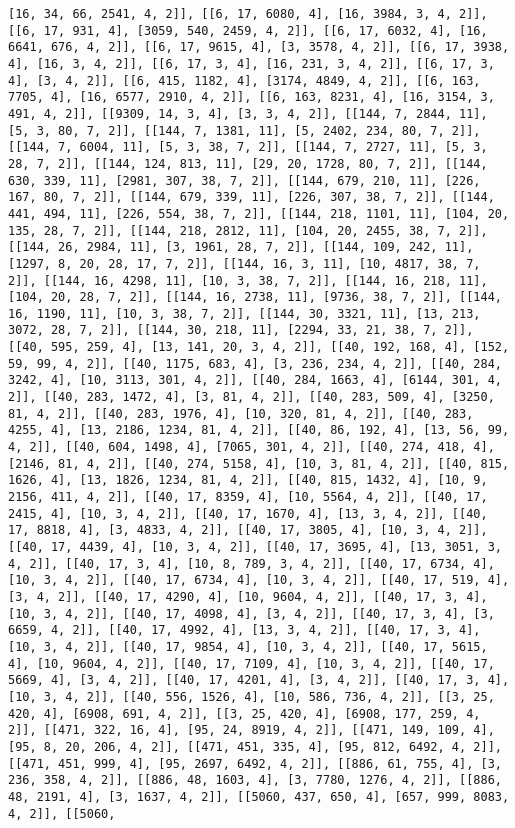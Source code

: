 \documentclass[12pt,fleqn]{article}\usepackage{../../common}
\begin{document}
\begin{verbatim}
[16, 34, 66, 2541, 4, 2]], [[6, 17, 6080, 4], [16, 3984, 3, 4, 2]], [[6, 17, 931, 4], [3059, 540, 2459, 4, 2]], [[6, 17, 6032, 4], [16, 6641, 676, 4, 2]], [[6, 17, 9615, 4], [3, 3578, 4, 2]], [[6, 17, 3938, 4], [16, 3, 4, 2]], [[6, 17, 3, 4], [16, 231, 3, 4, 2]], [[6, 17, 3, 4], [3, 4, 2]], [[6, 415, 1182, 4], [3174, 4849, 4, 2]], [[6, 163, 7705, 4], [16, 6577, 2910, 4, 2]], [[6, 163, 8231, 4], [16, 3154, 3, 491, 4, 2]], [[9309, 14, 3, 4], [3, 3, 4, 2]], [[144, 7, 2844, 11], [5, 3, 80, 7, 2]], [[144, 7, 1381, 11], [5, 2402, 234, 80, 7, 2]], [[144, 7, 6004, 11], [5, 3, 38, 7, 2]], [[144, 7, 2727, 11], [5, 3, 28, 7, 2]], [[144, 124, 813, 11], [29, 20, 1728, 80, 7, 2]], [[144, 630, 339, 11], [2981, 307, 38, 7, 2]], [[144, 679, 210, 11], [226, 167, 80, 7, 2]], [[144, 679, 339, 11], [226, 307, 38, 7, 2]], [[144, 441, 494, 11], [226, 554, 38, 7, 2]], [[144, 218, 1101, 11], [104, 20, 135, 28, 7, 2]], [[144, 218, 2812, 11], [104, 20, 2455, 38, 7, 2]], [[144, 26, 2984, 11], [3, 1961, 28, 7, 2]], [[144, 109, 242, 11], [1297, 8, 20, 28, 17, 7, 2]], [[144, 16, 3, 11], [10, 4817, 38, 7, 2]], [[144, 16, 4298, 11], [10, 3, 38, 7, 2]], [[144, 16, 218, 11], [104, 20, 28, 7, 2]], [[144, 16, 2738, 11], [9736, 38, 7, 2]], [[144, 16, 1190, 11], [10, 3, 38, 7, 2]], [[144, 30, 3321, 11], [13, 213, 3072, 28, 7, 2]], [[144, 30, 218, 11], [2294, 33, 21, 38, 7, 2]], [[40, 595, 259, 4], [13, 141, 20, 3, 4, 2]], [[40, 192, 168, 4], [152, 59, 99, 4, 2]], [[40, 1175, 683, 4], [3, 236, 234, 4, 2]], [[40, 284, 3242, 4], [10, 3113, 301, 4, 2]], [[40, 284, 1663, 4], [6144, 301, 4, 2]], [[40, 283, 1472, 4], [3, 81, 4, 2]], [[40, 283, 509, 4], [3250, 81, 4, 2]], [[40, 283, 1976, 4], [10, 320, 81, 4, 2]], [[40, 283, 4255, 4], [13, 2186, 1234, 81, 4, 2]], [[40, 86, 192, 4], [13, 56, 99, 4, 2]], [[40, 604, 1498, 4], [7065, 301, 4, 2]], [[40, 274, 418, 4], [2146, 81, 4, 2]], [[40, 274, 5158, 4], [10, 3, 81, 4, 2]], [[40, 815, 1626, 4], [13, 1826, 1234, 81, 4, 2]], [[40, 815, 1432, 4], [10, 9, 2156, 411, 4, 2]], [[40, 17, 8359, 4], [10, 5564, 4, 2]], [[40, 17, 2415, 4], [10, 3, 4, 2]], [[40, 17, 1670, 4], [13, 3, 4, 2]], [[40, 17, 8818, 4], [3, 4833, 4, 2]], [[40, 17, 3805, 4], [10, 3, 4, 2]], [[40, 17, 4439, 4], [10, 3, 4, 2]], [[40, 17, 3695, 4], [13, 3051, 3, 4, 2]], [[40, 17, 3, 4], [10, 8, 789, 3, 4, 2]], [[40, 17, 6734, 4], [10, 3, 4, 2]], [[40, 17, 6734, 4], [10, 3, 4, 2]], [[40, 17, 519, 4], [3, 4, 2]], [[40, 17, 4290, 4], [10, 9604, 4, 2]], [[40, 17, 3, 4], [10, 3, 4, 2]], [[40, 17, 4098, 4], [3, 4, 2]], [[40, 17, 3, 4], [3, 6659, 4, 2]], [[40, 17, 4992, 4], [13, 3, 4, 2]], [[40, 17, 3, 4], [10, 3, 4, 2]], [[40, 17, 9854, 4], [10, 3, 4, 2]], [[40, 17, 5615, 4], [10, 9604, 4, 2]], [[40, 17, 7109, 4], [10, 3, 4, 2]], [[40, 17, 5669, 4], [3, 4, 2]], [[40, 17, 4201, 4], [3, 4, 2]], [[40, 17, 3, 4], [10, 3, 4, 2]], [[40, 556, 1526, 4], [10, 586, 736, 4, 2]], [[3, 25, 420, 4], [6908, 691, 4, 2]], [[3, 25, 420, 4], [6908, 177, 259, 4, 2]], [[471, 322, 16, 4], [95, 24, 8919, 4, 2]], [[471, 149, 109, 4], [95, 8, 20, 206, 4, 2]], [[471, 451, 335, 4], [95, 812, 6492, 4, 2]], [[471, 451, 999, 4], [95, 2697, 6492, 4, 2]], [[886, 61, 755, 4], [3, 236, 358, 4, 2]], [[886, 48, 1603, 4], [3, 7780, 1276, 4, 2]], [[886, 48, 2191, 4], [3, 1637, 4, 2]], [[5060, 437, 650, 4], [657, 999, 8083, 4, 2]], [[5060, 
\end{verbatim}
\end{document}
